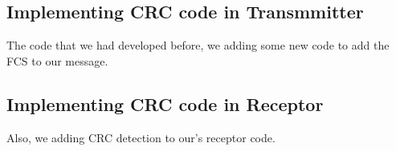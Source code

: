 \subsection{Implementing CRC code in Transmmitter}
The code that we had developed before, we adding some new code to add the FCS to our message.



\subsection{Implementing CRC code in Receptor}

Also, we adding CRC detection to our's receptor code.

